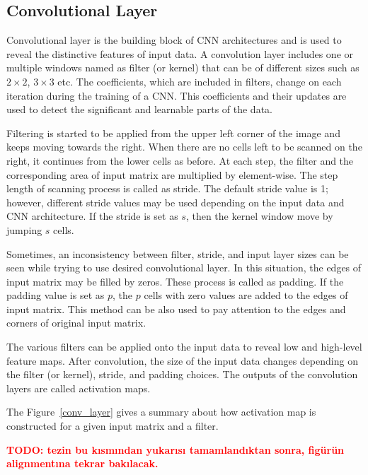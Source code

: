 \subsection{Convolutional Layer}

Convolutional layer is the building block of CNN architectures and is used to reveal the distinctive features of input data. A convolution layer includes one or multiple windows named as filter (or kernel) that can be of different sizes such as $2 \times 2$, $3\times3$ etc. The coefficients, which are included in filters, change on each iteration during the training of a CNN. This coefficients and their updates are used to detect the significant and learnable parts of the data.

Filtering is started to be applied from the upper left corner of the image and keeps moving towards the right. When there are no cells left to be scanned on the right, it continues from the lower cells as before. At each step, the filter and the corresponding area of input matrix are multiplied by element-wise. The step length of scanning process is called as stride. The default stride value is 1; however, different stride values may be used depending on the input data and CNN architecture. If the stride is set as $s$, then the kernel window move by jumping $s$ cells. 

Sometimes, an inconsistency between filter, stride, and input layer sizes can be seen while trying to use desired convolutional layer. In this situation, the edges of input matrix may be filled by zeros. These process is called as padding. If the padding value is set as $p$, the $p$ cells with zero values are added to the edges of input matrix. This method can be also used to pay attention to the edges and corners of original input matrix.

The various filters can be applied onto the input data to reveal low and high-level feature maps. After convolution, the size of the input data changes depending on the filter (or kernel), stride, and padding choices. The outputs of the convolution layers are called activation maps.

The Figure~\ref{conv_layer} gives a summary about how activation map is constructed for a given input matrix and a filter.

\textcolor{red}{\textbf{TODO: tezin bu kısmından yukarısı tamamlandıktan sonra, figürün alignmentına tekrar bakılacak.}}


